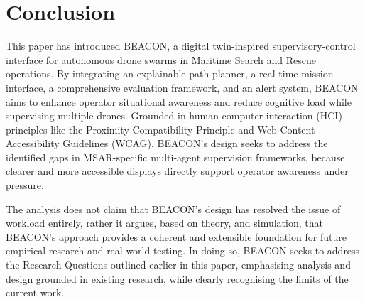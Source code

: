 \section{Conclusion}\label{sec:conclusion}

This paper has introduced BEACON, a digital twin-inspired supervisory-control interface for autonomous drone swarms in Maritime Search and Rescue operations.
By integrating an explainable path-planner, a real-time mission interface, a comprehensive evaluation framework, and an alert system, BEACON aims to enhance operator situational awareness and reduce cognitive load while supervising multiple drones.
Grounded in human-computer interaction (HCI) principles like the Proximity Compatibility Principle and Web Content Accessibility Guidelines (WCAG), BEACON's design seeks to address the identified gaps in MSAR-specific multi-agent supervision frameworks, because clearer and more accessible displays directly support operator awareness under pressure.

The analysis does not claim that BEACON's design has resolved the issue of workload entirely, rather it argues, based on theory, and simulation, that BEACON's approach provides a coherent and extensible foundation for future empirical research and real-world testing.
In doing so, BEACON seeks to address the Research Questions outlined earlier in this paper, emphasising analysis and design grounded in existing research, while clearly recognising the limits of the current work.
